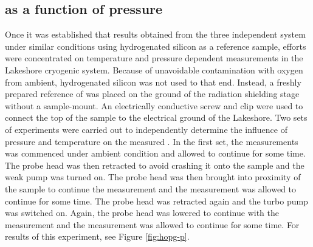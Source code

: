 \subsection{\cpd{} as a function of pressure}
Once it was established that results obtained from the three independent system under similar conditions using hydrogenated silicon as a reference sample, efforts were concentrated on temperature and pressure dependent measurements in the Lakeshore cryogenic system. Because of unavoidable contamination with oxygen from ambient, hydrogenated silicon was not used to that end. Instead, a freshly prepared reference of \hopg{} was placed on the ground of the radiation shielding stage without a sample-mount. An electrically conductive screw and clip were used to connect the top of the \hopg{} sample to the electrical ground of the Lakeshore. Two sets of experiments were carried out to independently determine the influence of pressure and temperature on the measured \cpd{}. In the first set, the measurements was commenced under ambient condition and allowed to continue for some time. The probe head was then retracted to avoid crashing it onto the sample and the weak pump was turned on. The probe head was then brought into proximity of the sample to continue the measurement and the measurement was allowed to continue for some time. The probe head was retracted again and the turbo pump was switched on. Again, the probe head was lowered to continue with the measurement and the measurement was allowed to continue for some time. For results of this experiment, see Figure \ref{fig:hopg-p}.
